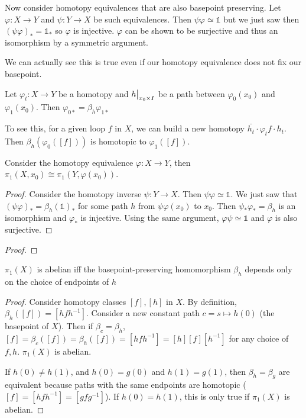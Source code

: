\documentclass[10pt]{article}
\newcommand\restr[2]{{%
  \left.\kern-\nulldelimiterspace %
  #1 %
  \vphantom{\big|} %
  \right|_{#2} %
}}
\begin{document}
	Now consider homotopy equivalences that are also basepoint preserving. Let $\varphi: X \to Y$ and $\psi: Y \to X$ be such equivalences. Then $\psi\varphi \simeq \mathds{1}$ but we just saw then $(\psi\varphi)_* = \mathds{1}_*$ so $\varphi$ is injective. $\varphi$ can be shown to be surjective and thus an isomorphism by a symmetric argument.

	We can actually see this is true even if our homotopy equivalence does not fix our basepoint.

\begin{lemma}[]
	Let $\varphi_t: X \to Y$ be a homotopy and $\restr{h}{x_0 \times I}$ be a path between $\varphi_0(x_0)$ and $\varphi_1(x_0)$. Then $\varphi_{0*} = \beta_h \varphi_{1*}$
\end{lemma}

\begin{note}
	To see this, for a given loop $f$ in $X$, we can build a new homotopy $\bar{h_t} \cdot \varphi_tf \cdot h_t$. Then $\beta_h(\varphi_0([f]))$ is homotopic to $\varphi_1([f])$.
\end{note}

\begin{theorem}
Consider the homotopy equivalence $\varphi: X \to Y$, then $\pi_1(X, x_0) \cong \pi_1(Y, \varphi(x_0))$.
\end{theorem}

\begin{proof}
	Consider the homotopy inverse $\psi: Y \to X$. Then $\psi\varphi \simeq \mathds{1}$. We just saw that $(\psi\varphi)_* = \beta_h(\mathds{1})_*$ for some path $h$ from $\psi\varphi(x_0)$ to $x_0$. Then $\psi_*\varphi_* = \beta_h$ is an isomorphism and $\varphi_*$ is injective.
	Using the same argument, $\varphi\psi \simeq \mathds{1}$ and $\varphi$ is also surjective.
\end{proof}

\begin{exercise}[]

\end{exercise}
\begin{proof}
\end{proof}

\begin{exercise}[1.1.3]
	$\pi_1(X)$ is abelian iff the basepoint-preserving homomorphism $\beta_h$ depends only on the choice of endpoints of $h$
\end{exercise}

\begin{proof}

	Consider homotopy classes $[f], [h]$ in $X$. By definition, $\beta_h([f]) = [hfh^{-1}]$. Consider a new constant path $c = s \mapsto h(0)$ (the basepoint of $X$). Then if $\beta_c = \beta_h$, $[f] = \beta_c([f]) = \beta_h([f]) = [hfh^{-1}] = [h][f][h^{-1}]$ for any choice of $f, h$. $\pi_1(X)$ is abelian.

	If $h(0) \neq h(1)$, and $h(0) = g(0)$ and $h(1) = g(1)$, then $\beta_h = \beta_g$ are equivalent because paths with the same endpoints are homotopic ($[f] = [hfh^{-1}] = [gfg^{-1}]$). If $h(0) = h(1)$, this is only true if $\pi_1(X)$ is abelian.

\end{proof}
\end{document}
